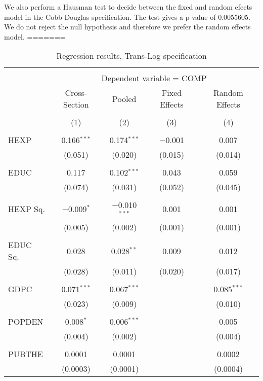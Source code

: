 \documentclass[12pt,a4paper]{article}\usepackage[]{graphicx}\usepackage[]{color}
\begin{document}
We also perform a Hausman test to decide between the fixed and random efects model in the Cobb-Douglas specification. The test gives a p-value of 0.0055605. We do not reject the null hypothesis and therefore we prefer the random effects model.
=======
\begin{table}[!htbp] \centering 
  \caption{Regression results, Trans-Log specification} 
  \label{tab:big} 
\scriptsize 
\begin{tabular}{@{\extracolsep{5pt}}lcccc} 
\\[-1.8ex]\hline 
\hline \\[-1.8ex] 
 & \multicolumn{4}{c}{Dependent variable = COMP} \\ 
\cline{2-5} 
 & Cross-Section & Pooled & Fixed Effects & Random Effects \\ 
\\[-1.8ex] & (1) & (2) & (3) & (4)\\ 
\hline \\[-1.8ex] 
 HEXP & 0.166$^{***}$ & 0.174$^{***}$ & $-$0.001 & 0.007 \\ 
  & (0.051) & (0.020) & (0.015) & (0.014) \\ 
  & & & & \\ 
 EDUC & 0.117 & 0.102$^{***}$ & 0.043 & 0.059 \\ 
  & (0.074) & (0.031) & (0.052) & (0.045) \\ 
  & & & & \\ 
 HEXP Sq. & $-$0.009$^{*}$ & $-$0.010$^{***}$ & 0.001 & 0.001 \\ 
  & (0.005) & (0.002) & (0.001) & (0.001) \\ 
  & & & & \\ 
 EDUC Sq. & 0.028 & 0.028$^{**}$ & 0.009 & 0.012 \\ 
  & (0.028) & (0.011) & (0.020) & (0.017) \\ 
  & & & & \\ 
 GDPC & 0.071$^{***}$ & 0.067$^{***}$ &  & 0.085$^{***}$ \\ 
  & (0.023) & (0.009) &  & (0.010) \\ 
  & & & & \\ 
 POPDEN & 0.008$^{*}$ & 0.006$^{***}$ &  & 0.005 \\ 
  & (0.004) & (0.002) &  & (0.004) \\ 
  & & & & \\ 
 PUBTHE & 0.0001 & 0.0001 &  & 0.0002 \\ 
  & (0.0003) & (0.0001) &  & (0.0004) \\ 

\end{tabular}
\end{table}
\end{document}
